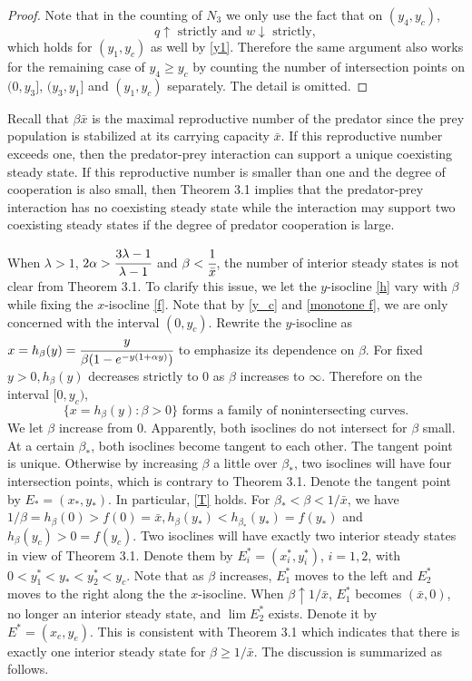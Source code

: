 \documentclass[11pt]{article}
\begin{document}
\begin{proof}
Note that in the counting of $N_3$ we only use the fact that on $(y_4,y_c)$,
$$
q \uparrow \mbox{ strictly and } w \downarrow \mbox{ strictly},
$$
which holds for $(y_1,y_c)$ as well by \eqref{y1}. Therefore the
same argument also works for the remaining case of $y_4 \geq y_c$
by counting the number of intersection points on  $(0,y_3]$,
$(y_3,y_1]$ and $(y_1,y_c)$ separately. The detail is omitted.
\end{proof}

\medskip

Recall that $\beta \bar x$ is the maximal reproductive number of
the predator since the prey population is stabilized at its
carrying capacity $\bar x$. If this reproductive number exceeds
one, then the predator-prey interaction can support a unique
coexisting steady state. If this reproductive number is smaller
than one and the degree of cooperation is also small, then Theorem
3.1 implies that the predator-prey interaction has no coexisting
steady state while the interaction may support two coexisting
steady states if the degree of predator cooperation is large.

When $\lambda>1$, $2\alpha> \cfrac{3\lambda-1}{\lambda-1}$ and
$\beta < \cfrac{1}{\bar x}$, the number of interior steady states
is not clear from Theorem 3.1. To clarify this issue, we let the
$y$-isocline \eqref{h}  vary with $\beta$  while fixing the
$x$-isocline \eqref{f}. Note that by  \eqref{y_c} and
\eqref{monotone f}, we are only concerned with the interval
$(0,y_c)$.    Rewrite the  $y$-isocline as
$x=h_{\beta}(y)=\cfrac{y}{\beta(1-e^{-y(1+\alpha y)})} $ to
emphasize its dependence on $\beta$. For fixed $y>0, h_{\beta}(y)$
decreases strictly to $0$ as $\beta$ increases to $\infty$.
Therefore on the interval $ [0,y_c)$,
\begin{equation}\label{bfamily}
  \{  x=h_{\beta}(y) :   \beta >0 \} \mbox{ forms a family of nonintersecting curves}.
\end{equation}
We let $\beta $ increase from $0$. Apparently, both isoclines do not intersect for $\beta $ small. At a certain $\beta_* $,
both isoclines become tangent to each other. The tangent point is unique.
Otherwise by increasing $\beta $ a little over $\beta_* $, two isoclines will have four intersection points, which is contrary to Theorem 3.1.
 Denote the tangent point by  $E_*=(x_*, y_*)$. In particular, \eqref{T} holds. For $\beta_* <\beta < 1/\bar x$,
 we have $ 1/\beta =h_{\beta}(0) > f(0) = \bar x, h_{\beta}(y_*) <h_{\beta_*}(y_*)= f(y_*)$ and  $h_{\beta}(y_c) > 0=f(y_c)$.
 Two isoclines will have exactly two interior steady states in view of Theorem 3.1. Denote them by $E_i^*=(x_i^*,y_i^*)$, $i=1,2$,
 with $0<y_1^*<y_*<y_2^*<y_c$. Note that as $\beta$ increases, $E_1^* $ moves to the left and $E_2^* $ moves to the right along the
 the $x$-isocline. When $\beta \uparrow 1/\bar x$, $E_1^* $ becomes $(\bar x,0)$, no longer an interior steady state,
 and $ \lim E_2^* $  exists. Denote it by $E^*=(x_e, y_e).$  This is consistent with  Theorem 3.1 which indicates that there is exactly
  one interior steady state for $\beta  \geq 1/\bar x$.  The
discussion is summarized as follows.
\end{document}
